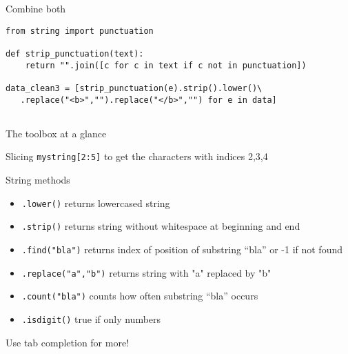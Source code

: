 \begin{frame}[fragile]{Combine both}
\begin{verbatim}
from string import punctuation

def strip_punctuation(text):
    return "".join([c for c in text if c not in punctuation])

data_clean3 = [strip_punctuation(e).strip().lower()\
   .replace("<b>","").replace("</b>","") for e in data]
    
\end{verbatim}
\end{frame}




\begin{frame}{The toolbox at a glance}
  \footnotesize
\begin{block}{Slicing}
\texttt{mystring[2:5]} to get the characters with indices 2,3,4
\end{block}

\begin{block}{String methods}
\begin{itemize}
	\item \texttt{.lower()} returns lowercased string
	\item \texttt{.strip()} returns string without whitespace at beginning and end
	\item \texttt{.find("bla")} returns index of position of substring ``bla'' or -1 if not found
	\item \texttt{.replace("a","b")} returns string with "a" replaced by "b"
	\item \texttt{.count("bla")} counts how often substring ``bla'' occurs
        \item \texttt{.isdigit()} true if only numbers
          
\end{itemize}
Use tab completion for more!
\end{block}
\end{frame}




